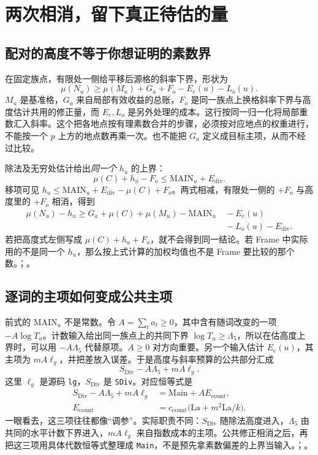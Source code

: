\section{两次相消，留下真正待估的量}
\subsection{配对的高度不等于你想证明的素数界}
在固定族点，有限处一侧给平移后源格的斜率下界，形状为
\[
   \mu(N_u)\ge\mu(M_u)+G_a+F_o-E_e(u)-L_o(u).
\]
$M_u$ 是基准格，$G_a$ 来自局部有效收益的总账，$F_o$ 是同一族点上换格斜率下界与高度估计共用的修正量，而 $E_e,L_o$ 是另外处理的成本。这行按同一归一化将局部重数汇入斜率。这个把各地点按有理素数合并的步骤，必须按对应地点的权重进行，不能按一个 $p$ 上方的地点数再乘一次。也不能把 $G_a$ 定义成目标主项，从而不经过比较。

除法及无穷处估计给出\emph{同一个} $h_u$ 的上界：
\[
       \mu(C)+h_u-F_o\le \mathrm{MAIN}_u+E_{\mathrm{div}}.
\]
移项可见 $h_u\le\mathrm{MAIN}_u+E_{\mathrm{div}}-\mu(C)+F_o$。两式相减，有限处一侧的 $+F_o$ 与高度里的 $+F_o$ 相消，得到
\[
\begin{aligned}
 \mu(N_u)-h_u\ge G_a+\mu(C)+\mu(M_u)
  -\mathrm{MAIN}_u\ &{}-E_e(u)\\
  &{}-L_o(u)-E_{\mathrm{div}}.
\end{aligned}
\]
若把高度式左侧写成 $\mu(C)+h_u+F_o$，就不会得到同一结论。若 Frame 中实际用的不是同一个 $h_u$，那么按上式计算的加权均值也不是 Frame 要比较的那个数。；。

\subsection{逐词的主项如何变成公共主项}
前式的 $\mathrm{MAIN}_u$ 不是常数。令 $A=\sum_t a_t\ge0$，其中含有随词改变的一项 $-A\log T_u$。计数输入给出同一族点上的共同下界 $\log T_u\ge\Lambda_5$，所以在估高度上界时，可以用 $-A\Lambda_5$ 代替原项。$A\ge0$ 对方向重要。另一个输入估计 $E_e(u)$，其主项为 $mA\ell_g$，并把差放入误差。于是高度与斜率预算的公共部分汇成
\[
 S_{\mathrm{Div}}-A\Lambda_5+mA\ell_g.
\]
这里 $\ell_g$ 是源码 \texttt{lg}，$S_{\mathrm{Div}}$ 是 \texttt{SDiv}。对应恒等式是
\[
\begin{aligned}
 S_{\mathrm{Div}}-A\Lambda_5+mA\ell_g
      &=\mathrm{Main}+A E_{\mathrm{count}},\\
 E_{\mathrm{count}}&=c_{\mathrm{count}}
      \bigl(\mathrm{La}+m^2\mathrm{La}/k\bigr).
\end{aligned}
\]
一眼看去，这三项往往都像“调参”。实际职责不同：$S_{\mathrm{Div}}$ 随除法高度进入，$\Lambda_5$ 由共同的水平计数下界进入，$mA\ell_g$ 来自指数成本的主项。公共修正相消之后，再把这三项用具体代数恒等式整理成 \texttt{Main}，不是预先拿素数偏差的上界当输入。；。

